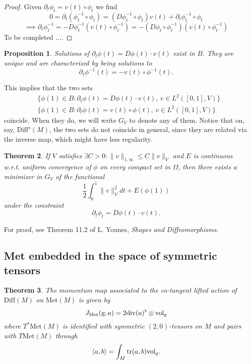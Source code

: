 \documentclass{article}
\theoremstyle{plain}
\newtheorem{teo}{Theorem}[section]
\newtheorem{prop}[teo]{Proposition}
\theoremstyle{definition}
\newcommand{\g}{\ensuremath{\textsl{g}}}
\newcommand{\Diff}{\ensuremath{\mathrm{Diff}}}
\newcommand{\Met}{\ensuremath{\mathrm{Met}}}
\newcommand{\Div}{\ensuremath{\mathrm{div}}}
\newcommand{\Vol}{\ensuremath{\mathrm{vol}}}
\newcommand{\tr}{\ensuremath{\mathrm{tr}}}
\begin{document}
\begin{proof}
Given $\partial_t\phi_t = v(t)\circ \phi_t$ we find
\[
 0= \partial_t(\phi^{-1}_t\circ\phi_t )=\left(D\phi^{-1}_t\circ \phi_t\right) v(t)+\partial_t\phi^{-1}_t\circ\phi_t 
\]
\[
\implies \partial_t\phi^{-1}_t=-D\phi_t^{-1} \left(v(t)\circ\phi_t^{-1}\right)=-\left(D\phi_t\circ\phi_t^{-1}\right)\left(v(t)\circ\phi_t^{-1}\right)
\]
To be completed ....
\end{proof}

\begin{prop}
Solutions of $\partial_t\phi(t)=D\phi(t)\cdot v(t)$ exist in $B$. They are unique and are characterized by being solutions to 
\[
\partial_t\phi^{-1}(t)=-v(t)\circ \phi^{-1}(t).
\]
\end{prop}
This implies that the two sets
%
\begin{align*}
&\{\phi(1)\in B : \partial_t\phi(t)=D\phi(t)\cdot v(t),\ v\in L^2([0,1],V)\} \\
&\{\phi(1)\in B : \partial_t\phi(t)=v(t)\circ \phi(t),\ v\in L^2([0,1],V)\}
\end{align*}
%
coincide. When they do, we will write $G_V$ to denote any of them. Notice that on, say, $\Diff^s(M)$, the two sets do not coincide in general, since they are related via the inverse map, which might have less regularity.

\begin{teo}
If $V$ satisfies $\exists C>0: \|v\|_{1,\infty}\leq C\|v\|_V$ and $E$ is continuous w.r.t. uniform convergence of $\phi$ on every compact set in $\Omega$, then there exists a minimizer in $G_V$ of the functional 
\[
  \frac{1}{2}\int_0^1\|v\|^2_Vdt + E(\phi(1))
\]
under the constraint
\[
\partial_t\phi_t=D\phi(t)\cdot v(t).
\]
\end{teo}

For proof, see Theorem 11.2 of L. Younes, \textit{Shapes and Diffeomorphisms}.




\subsection{Met embedded in the space of symmetric tensors}


\begin{teo}
	The momentum map associated to  the co-tangent lifted action  of $\Diff(M)$ on $\Met(M)$ is given by
	\[
	  J_\Met(\g,a)=2\Div (a)^\flat \otimes \Vol_\g  
	\]
	where $T^*\Met(M)$ is identified with  symmetric $(2,0)$-tensors on $M$ and  pairs with $T\Met(M)$ through
	\[
	\langle a,b\rangle = \int_M \tr (a,b)\Vol_\g.
	\]
\end{teo}
\end{document}
